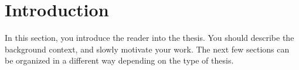 
\section{Introduction}
\label{sec:thesis_introduction}  %

In this section, you introduce the reader into the thesis. You should describe the background context, and slowly motivate your work.
The next few sections can be organized in a different way depending on the type of thesis.
